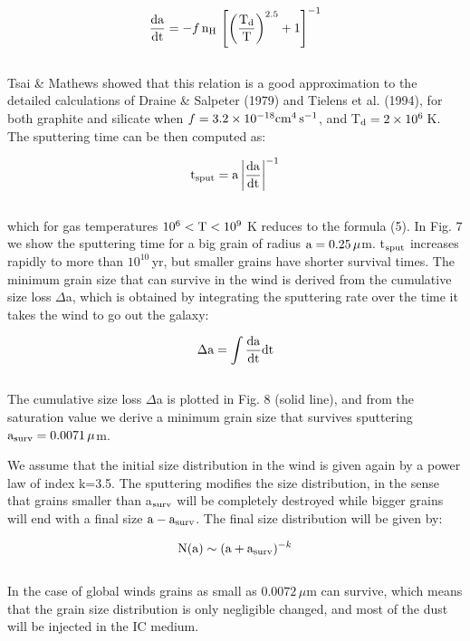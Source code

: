 \documentclass[]{aa}
\begin{document}
\begin{eqnarray}
\frac{\rm da}{\rm dt} = -f\,{\rm n}_{\rm H}\,\left[\left(\frac{{\rm T}_{\rm d}}
{{\rm T}}\right)^{2.5}+ 1\right]^{-1}
\end{eqnarray}
\\
Tsai \& Mathews showed that this relation is a good approximation to the
detailed calculations of Draine \& Salpeter (1979) and Tielens et al. (1994),
for both graphite and silicate when 
$f=3.2\times10^{-18}{\rm cm}^4\,{\rm s}^{-1}$, and 
T$_{\rm d}=2\times 10^6$\,K. The
sputtering time can be then computed as:

\begin{eqnarray}
{\rm t}_{\rm sput} = {\rm a}\left |\frac{{\rm da}}{{\rm dt}}\right|^{-1}
\end{eqnarray}
\\
which for gas temperatures $10^6 < {\rm T} < 10^9$ K reduces to the formula 
(5). In Fig. 7 we show the sputtering time for a big grain of radius 
${\rm a}=0.25\,{\mu}$m. t$_{\rm sput}$ increases rapidly to more than 
$10^{10}$\,yr, 
but smaller grains have shorter survival times. The minimum grain 
size that can survive in the wind is derived from the cumulative size loss 
$\Delta$a, which is obtained by
integrating the sputtering rate over the time it takes the wind to go out the
galaxy: 

\begin{eqnarray}
\Delta {\rm a} = \int \frac{{\rm da}}{{\rm dt}} {\rm dt}
\end{eqnarray}
\\
The cumulative size loss $\Delta$a is plotted in Fig. 8 (solid line), and
from the saturation value we derive a minimum grain
size that survives sputtering ${\rm a}_{\rm surv}=0.0071\,{\mu}$m.

We assume that the initial size distribution in the wind is given again by a
power law of index k=3.5. The sputtering modifies the size distribution, in the
sense that grains smaller than a$_{\rm surv}$ will be completely destroyed while
bigger grains will end with a final size ${\rm a-a_{surv}}$. The final size
distribution will be given by:

\begin{eqnarray}
{\rm N}({\rm a}) \sim ({\rm a}+{\rm a}_{\rm surv})^{-k}
\end{eqnarray}
\\


In the case of global winds grains as small as $0.0072\,{\mu}$m can survive,
which means that the grain size distribution is only negligible changed, and
most of the dust will be injected in the IC medium. 
\end{document}
